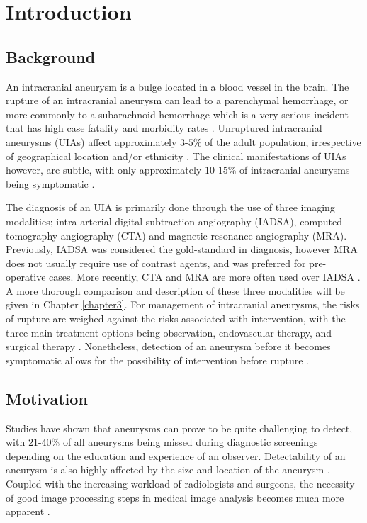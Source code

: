 \chapter{Introduction}
\label{chapter1}

\section{Background}
An intracranial aneurysm is a bulge located in a blood vessel in the brain. The rupture of an intracranial aneurysm can lead to a parenchymal hemorrhage, or more commonly to a subarachnoid hemorrhage which is a very serious incident that has high case fatality and morbidity rates \cite{Keedy2006}. Unruptured intracranial aneurysms (UIAs) affect approximately $3$-$5 \%$ of the adult population, irrespective of geographical location and/or ethnicity \cite{vlak2011prevalence}. The clinical manifestations of UIAs however, are subtle, with only approximately $10$-$15\%$ of intracranial aneurysms being symptomatic \cite{friedman2001small}. 

The diagnosis of an UIA is primarily done through the use of three imaging modalities; intra-arterial digital subtraction angiography (IADSA), computed tomography angiography (CTA) and magnetic resonance angiography (MRA). Previously, IADSA was considered the gold-standard in diagnosis, however MRA does not usually require use of contrast agents, and was preferred for pre-operative cases. More recently, CTA and MRA are more often used over IADSA . A more thorough comparison and description of these three modalities will be given in Chapter \ref{chapter3}. For management of intracranial aneurysms, the risks of rupture are weighed against the risks associated with intervention, with the three main treatment options being observation, endovascular therapy, and surgical therapy \cite{Keedy2006}. Nonetheless, detection of an aneurysm before it becomes symptomatic allows for the possibility of intervention before rupture  .  

\section{Motivation}
Studies have shown that aneurysms can prove to be quite challenging to detect, with $21$-$40\%$ of all aneurysms being missed during diagnostic screenings depending on the education and experience of an observer. Detectability of an aneurysm is also highly affected by the size and location of the aneurysm \cite{okahara2002diagnostic}. Coupled with the increasing workload of radiologists and surgeons, the necessity of good image processing steps in medical image analysis becomes much more apparent .

